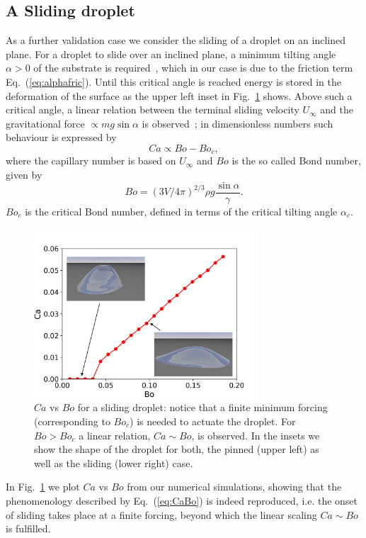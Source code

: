 \subsection{A Sliding droplet}
As a further validation case we consider the sliding of a droplet on an inclined plane.
For a droplet to slide over an inclined plane, a minimum tilting angle $\alpha >0$ of the substrate is required~\cite{Furmidge}, which in our case is due to the friction term Eq.~(\ref{eq:alphafric}). Until this critical angle is reached energy is stored in the deformation of the surface as the upper left inset in Fig.~\ref{fig:CaBo} shows. Above such a critical angle, a linear relation between the terminal sliding velocity $U_{\infty}$ and the gravitational force $\propto m g \sin \alpha$ is observed~\cite{Podgorski,Kim,Sbragaglia}; in dimensionless numbers such 
behaviour is expressed by 
\begin{equation}\label{eq:CaBo}
Ca \propto Bo - Bo_c,
\end{equation}
where the capillary number is based on $U_{\infty}$ and $Bo$ is the so called Bond number, given by
\begin{equation}
  Bo = (3V/4\pi)^{2/3}\rho g \frac{\sin\alpha}{\gamma}.
\end{equation}
$Bo_c$ is the critical Bond number, defined in terms of the critical 
tilting angle $\alpha_c$.
  \begin{figure}
    \centering
    \includegraphics[width=0.75\textwidth]{graphics/Fig_7_Ca_Bo_true_with_pic.png}
    \caption{$Ca$ vs $Bo$ for a sliding droplet: notice that a finite minimum forcing (corresponding to $Bo_c$) is needed to actuate the droplet. For $Bo > Bo_c$ a linear relation, $Ca \sim Bo$, is observed. In the insets we show the shape of the droplet for both, the pinned (upper left) as well as the sliding (lower right) case.
    }
    \label{fig:CaBo}
\end{figure}
In Fig.~\ref{fig:CaBo} we plot $Ca$ vs $Bo$ from our numerical simulations, showing that the phenomenology described by Eq.~(\ref{eq:CaBo}) is 
indeed reproduced, i.e. the onset of sliding takes place at a finite 
forcing, beyond which the linear scaling $Ca \sim Bo$ is fulfilled. 

